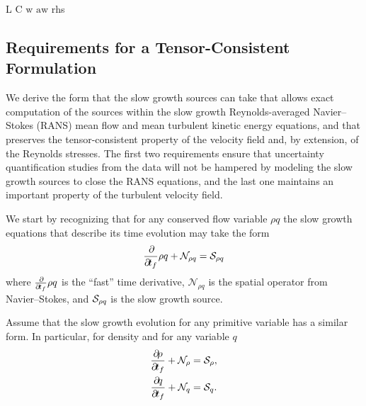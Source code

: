 {\makecommand{\lowM}     {L}                         %
\makecommand{\cev}      {C}                         %
\makecommand{\wall}     {\ensuremath{\mathrm{w}}}   %
\makecommand{\awall}    {\ensuremath{\mathrm{aw}}}  %
\makecommand{\rhs}      {rhs}                       %

\subsection{Requirements for a Tensor-Consistent Formulation}

We derive the form that the slow growth sources can take that
allows exact computation of the sources within the slow growth Reynolds-averaged Navier--Stokes (RANS)
mean flow and mean turbulent kinetic energy equations,
and that preserves the tensor-consistent
property of the velocity field and, by extension, of the Reynolds stresses.
The first two requirements ensure that uncertainty quantification studies from the data will not be
hampered by modeling the slow growth sources to close the RANS
equations, and the last one maintains an important property of the turbulent
velocity field.
%

We start by recognizing that for any conserved flow variable $\rho q$ the
slow growth equations that describe its time evolution may take the form
%
\begin{gather}
\frac{\partial\!{}}{\partial\!{t_f}}\rho q + \mathcal{N}_{\rho q} = \mathcal{S}_{\rho q}
\end{gather}
%
where $\frac{\partial\!{}}{\partial\!{t_f}}\rho q$ is the ``fast'' time derivative,
$\mathcal{N}_{\rho q}$ is the spatial operator from Navier--Stokes, and
$\mathcal{S}_{\rho q}$ is the slow growth source.

Assume that the slow growth evolution for any primitive variable has a
similar form. In particular, for density and for any variable $q$
%
\begin{gather}
\frac{\partial\!{\rho}}{\partial\!{t_f}} + \mathcal{N}_{\rho} = \mathcal{S}_{\rho}, \\
\frac{\partial\!{q}}{\partial\!{t_f}}    + \mathcal{N}_{q}    = \mathcal{S}_{q}.
\end{gather}
%

}
